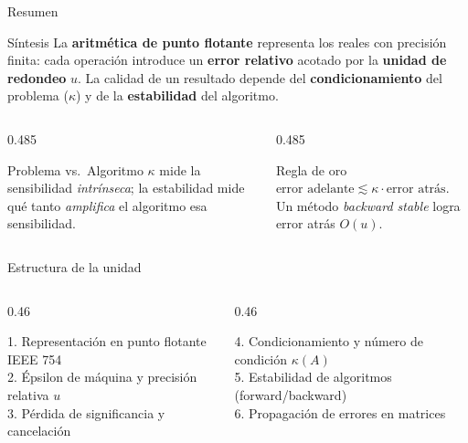 \documentclass[aspectratio=169,10pt]{beamer}
\begin{document}
\begin{frame}{Resumen}
\begin{cardidea}{Síntesis}{\faLightbulb}
La \textbf{aritmética de punto flotante} representa los reales con precisión finita: cada operación introduce un \textbf{error relativo} acotado por la \textbf{unidad de redondeo} $u$. La calidad de un resultado depende del \textbf{condicionamiento} del problema ($\kappa$) y de la \textbf{estabilidad} del algoritmo.
\end{cardidea}
\vspace{2mm}
\begin{columns}[T]
\begin{column}{0.485\textwidth}
\begin{cardgear}{Problema vs.\ Algoritmo}{\faCogs}
$\kappa$ mide la sensibilidad \emph{intrínseca}; la estabilidad mide qué tanto \emph{amplifica} el algoritmo esa sensibilidad.
\end{cardgear}
\end{column}
\begin{column}{0.485\textwidth}
\begin{cardgear}{Regla de oro}{\faCogs}
$\text{error adelante}\lesssim \kappa\cdot\text{error atrás}$. Un método \emph{backward stable} logra error atrás $O(u)$.
\end{cardgear}
\end{column}
\end{columns}
\end{frame}

\begin{frame}{Estructura de la unidad}
\vspace{4mm}
\begin{columns}[T]
\begin{column}{0.46\textwidth}
\begin{cardlista}
1.\; Representación en punto flotante IEEE 754\\[0.6mm]
2.\; Épsilon de máquina y precisión relativa $u$\\[0.6mm]
3.\; Pérdida de significancia y cancelación
\end{cardlista}
\end{column}
\begin{column}{0.46\textwidth}
\begin{cardlista}
4.\; Condicionamiento y número de condición $\kappa(A)$\\[0.6mm]
5.\; Estabilidad de algoritmos (forward/backward)\\[0.6mm]
6.\; Propagación de errores en matrices
\end{cardlista}
\end{column}
\end{columns}
\end{frame}
\end{document}
